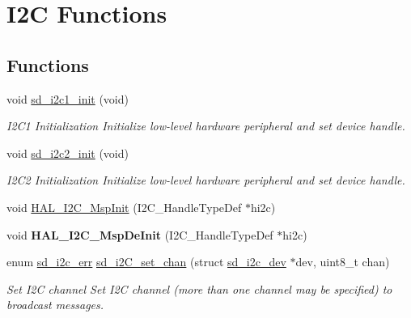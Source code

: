 \hypertarget{group___s_d___i2_c___functions}{}\section{I2C Functions}
\label{group___s_d___i2_c___functions}
\subsection*{Functions}
\begin{DoxyCompactItemize}
\item 
void \mbox{\hyperlink{group___s_d___i2_c___functions_ga47b7e9401e2826acc6b03f258dc644a9}{sd\+\_\+i2c1\+\_\+init}} (void)
\begin{DoxyCompactList}\small\item\em I2\+C1 Initialization Initialize low-\/level hardware peripheral and set device handle. \end{DoxyCompactList}\item 
void \mbox{\hyperlink{group___s_d___i2_c___functions_ga8ae735df0c54e25588a526d9a92d3a69}{sd\+\_\+i2c2\+\_\+init}} (void)
\begin{DoxyCompactList}\small\item\em I2\+C2 Initialization Initialize low-\/level hardware peripheral and set device handle. \end{DoxyCompactList}\item 
void \mbox{\hyperlink{group___s_d___i2_c___functions_gabe01a202c27b23fc150aa66af3130073}{H\+A\+L\+\_\+\+I2\+C\+\_\+\+Msp\+Init}} (I2\+C\+\_\+\+Handle\+Type\+Def $\ast$hi2c)
\item 
\mbox{\label{group___s_d___i2_c___functions_ga2ec8d9b09854c732e2feed549278f048}} 
void {\bfseries H\+A\+L\+\_\+\+I2\+C\+\_\+\+Msp\+De\+Init} (I2\+C\+\_\+\+Handle\+Type\+Def $\ast$hi2c)
\item 
enum \mbox{\hyperlink{group___s_d___i2_c___types_gae1e3131e61bdef08371262ffb4948a04}{sd\+\_\+i2c\+\_\+err}} \mbox{\hyperlink{group___s_d___i2_c___functions_ga6bd934690e906815d10e8812be1b5215}{sd\+\_\+i2\+C\+\_\+set\+\_\+chan}} (struct \mbox{\hyperlink{structsd__i2c__dev}{sd\+\_\+i2c\+\_\+dev}} $\ast$dev, uint8\+\_\+t chan)
\begin{DoxyCompactList}\small\item\em Set I2C channel Set I2C channel (more than one channel may be specified) to broadcast messages. \end{DoxyCompactList}\item 

\end{DoxyCompactItemize}

